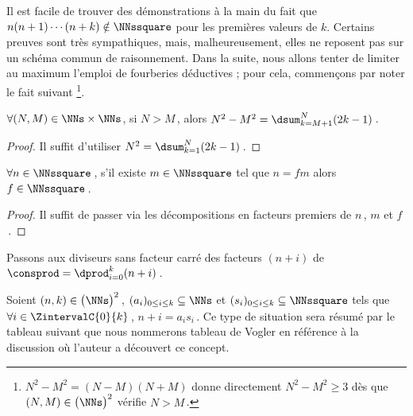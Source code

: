 Il est facile de trouver des démonstrations à la main du fait que $n(n+1) \cdots (n + k) \notin \NNssquare$ pour les premières valeurs de $k$.
Certains preuves sont très sympathiques, mais, malheureusement, elles ne reposent pas sur un schéma commun de raisonnement.
Dans la suite, nous allons tenter de limiter au maximum l'emploi de fourberies déductives ; pour cela, commençons par noter le fait suivant
\footnote{
	$N^2 - M^2 = (N - M)(N + M)$ donne directement $N^2 - M^2 \geq 3$ dès que $(N, M) \in \big( \NNs \big)^2$ vérifie $N > M$\,.
}.


\begin{fact} \label{dist-square}
	$\forall (N, M) \in \NNs \times \NNs$, 
	si $N > M$\,, alors $N^2 - M^2 = \dsum_{k=M+1}^{N} (2 k - 1)$\,.
\end{fact}


\begin{proof}
	Il suffit d'utiliser $N^2 = \dsum_{k=1}^{N} (2 k - 1)$\,.
\end{proof}




\begin{fact} \label{facto-square}
	$\forall n \in \NNssquare$\,, s'il existe $m \in \NNssquare$ tel que $n =  f m$ alors $f  \in \NNssquare$\,.
\end{fact}


\begin{proof}
	Il suffit de passer via les décompositions en facteurs premiers de $n$\,, $m$ et $f$\,.
\end{proof}




Passons aux diviseurs sans facteur carré des facteurs $(n + i)$ de $\consprod = \dprod_{i = 0}^{k} (n + i)$\,. 


\begin{defi}
	Soient $(n, k) \in \big( \NNs \big)^2$\,,
	$( a_i )_{0 \leq i \leq k} \subseteq \NNs$
	et
	$( s_i )_{0 \leq i \leq k} \subseteq \NNssquare$
	tels que 
	$\forall i \in \ZintervalC{0}{k}$\,, $n + i = a_i s_i$\,.
	Ce type de situation sera résumé par le tableau suivant que nous nommerons tableau de Vogler en référence à la discussion où l'auteur a découvert ce concept.

	\begin{center}
	\end{center}
\end{defi}


